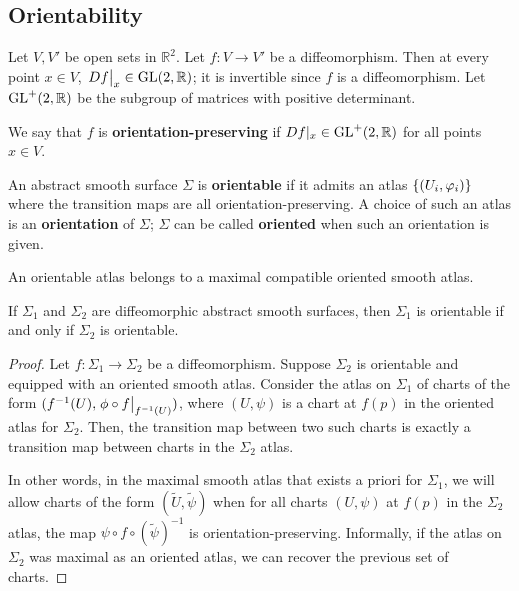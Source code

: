\documentclass[a4paper,11pt]{article}
\begin{document}
\subsection{Orientability}
Let \( V, V' \) be open sets in \( \mathbb R^2 \).
	Let \( f \colon V \to V' \) be a diffeomorphism.
	Then at every point \( x \in V \), \( \eval{Df}_x \in \GL(2,\mathbb R) \); it is invertible since \( f \) is a diffeomorphism.
	Let \( \mathrm{GL}^+(2,\mathbb R) \) be the subgroup of matrices with positive determinant.
\begin{definition}
	We say that \( f \) is \textbf{orientation-preserving} if $ Df|_x\in \mathrm{GL}^+(2,\mathbb R) $ for all points \( x \in V \).
\end{definition}
\begin{definition}
	An abstract smooth surface \( \Sigma \) is \textbf{orientable} if it admits an atlas \( \qty{(U_i, \varphi_i)} \) where the transition maps are all orientation-preserving.
	A choice of such an atlas is an \textbf{orientation} of \( \Sigma \); \( \Sigma \) can be called \textbf{oriented} when such an orientation is given.
\end{definition}
\begin{remark}
	An orientable atlas belongs to a maximal compatible oriented smooth atlas.
\end{remark}
\begin{lemma}
	If \( \Sigma_1 \) and \( \Sigma_2 \) are diffeomorphic abstract smooth surfaces, then \( \Sigma_1 \) is orientable if and only if \( \Sigma_2 \) is orientable.
\end{lemma}
\begin{proof}
	Let \( f \colon \Sigma_1 \to \Sigma_2 \) be a diffeomorphism.
	Suppose \( \Sigma_2 \) is orientable and equipped with an oriented smooth atlas.
	Consider the atlas on \( \Sigma_1 \) of charts of the form \( (f^{-1}(U), \eval{\phi \circ f}_{f^{-1}(U)}) \), where \( (U, \psi) \) is a chart at \( f(p) \) in the oriented atlas for \( \Sigma_2 \).
	Then, the transition map between two such charts is exactly a transition map between charts in the \( \Sigma_2 \) atlas.
	\begin{center}
	\end{center}
	In other words, in the maximal smooth atlas that exists a priori for \( \Sigma_1 \), we will allow charts of the form \( (\widetilde U, \widetilde \psi) \) when for all charts \( (U, \psi) \) at \( f(p) \) in the \( \Sigma_2 \) atlas, the map \( \psi \circ f \circ (\widetilde \psi)^{-1} \) is orientation-preserving.
	Informally, if the atlas on \( \Sigma_2 \) was maximal as an oriented atlas, we can recover the previous set of charts.
\end{proof}
\end{document}

